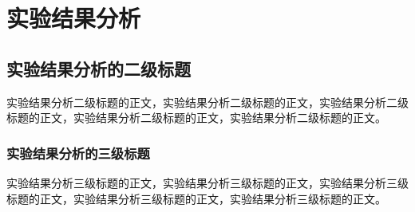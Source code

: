 \section{实验结果分析\label{实验结果分析}}

\subsection{实验结果分析的二级标题}

实验结果分析二级标题的正文，实验结果分析二级标题的正文，实验结果分析二级标题的正文，实验结果分析二级标题的正文，实验结果分析二级标题的正文。

\subsubsection{实验结果分析的三级标题}

实验结果分析三级标题的正文，实验结果分析三级标题的正文，实验结果分析三级标题的正文，实验结果分析三级标题的正文，实验结果分析三级标题的正文。